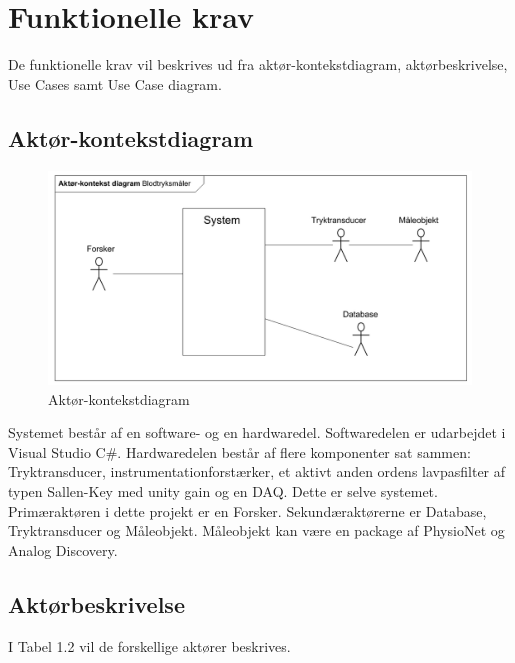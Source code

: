 \section{Funktionelle krav}
De funktionelle krav vil beskrives ud fra aktør-kontekstdiagram, aktørbeskrivelse, Use Cases samt Use Case diagram. 

\subsection{Aktør-kontekstdiagram}
\begin{figure}[H]
	\centering
	\includegraphics[width=1\textwidth]{Figurer/Snip20151104_43}
	\caption{Aktør-kontekstdiagram}
	\label{fig:aktoerbeskrivelse}
\end{figure}

Systemet består af en software- og en hardwaredel. Softwaredelen er udarbejdet i Visual Studio C\#. Hardwaredelen består af flere komponenter sat sammen: Tryktransducer, instrumentationforstærker, et aktivt anden ordens lavpasfilter af typen Sallen-Key med unity gain og en DAQ. Dette er selve systemet. \\
Primæraktøren i dette projekt er en Forsker. Sekundæraktørerne er Database, Tryktransducer og Måleobjekt. Måleobjekt kan være en package af PhysioNet og Analog Discovery. 

\subsection{Aktørbeskrivelse}
I Tabel 1.2 vil de forskellige aktører beskrives. 

